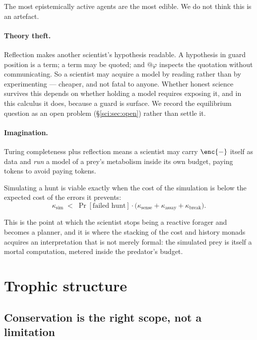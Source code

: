 The most epistemically active agents are the most edible. We do not think this is an artefact.

\paragraph{Theory theft.} Reflection makes another scientist's hypothesis readable. A hypothesis in
guard position is a term; a term may be quoted; and $@\varphi$ inspects the quotation without
communicating. So a scientist may acquire a model by reading rather than by experimenting --- cheaper,
and not fatal to anyone. Whether honest science survives this depends on whether holding a model
requires exposing it, and in this calculus it does, because a guard is surface. We record the
equilibrium question as an open problem (\S\ref{sci:sec:open}) rather than settle it.

\paragraph{Imagination.} Turing completeness plus reflection means a scientist may carry $\enc{-}$
itself as data and \emph{run} a model of a prey's metabolism inside its own budget, paying tokens to
avoid paying tokens.

\begin{proposition}
\label{sci:prop:imagination}
Simulating a hunt is viable exactly when the cost of the simulation is below the expected cost of the
errors it prevents:
\[
\kappa_{\mathrm{sim}} \;<\; \Pr[\text{failed hunt}] \cdot \big(\kappa_{\mathrm{sense}} +
\kappa_{\mathrm{assay}} + \kappa_{\mathrm{break}}\big).
\]
\end{proposition}

This is the point at which the scientist stops being a reactive forager and becomes a planner, and it
is where the stacking of the cost and history monads acquires an interpretation that is not merely
formal: the simulated prey is itself a mortal computation, metered inside the predator's budget.

\section{Trophic structure}\label{sci:S11}
\label{sci:sec:trophic}

\subsection{Conservation is the right scope, not a limitation}\label{sci:S11.1}

